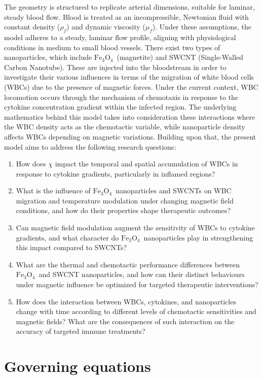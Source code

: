 \documentclass[10pt]{NSP1}
\def\feo{\ensuremath{\mathrm{Fe}_3\mathrm{O}_4}}
\begin{document}
	The geometry is structured to replicate arterial dimensions, suitable for laminar, steady blood flow. Blood is treated as an incompressible, Newtonian fluid with constant density ($\rho_{f}$) and dynamic viscosity ($\mu_{f}$). Under these assumptions, the model adheres to a steady, laminar flow profile, aligning with physiological conditions in medium to small blood vessels. There exist two types of nanoparticles, which include \feo\ (magnetite) and SWCNT (Single-Walled Carbon Nanotube). These are injected into the bloodstream in order to investigate their various influences in terms of the migration of white blood cells (WBCs) due to the presence of magnetic forces. Under the current context, WBC locomotion occurs through the mechanism of chemotaxis in response to the cytokine concentration gradient within the infected region. The underlying mathematics behind this model takes into consideration these interactions where the WBC density acts as the chemotactic variable, while nanoparticle density affects WBCs depending on magnetic variations. Building upon that, the present model aims to address the following research questions:
	\begin{enumerate}[label=\arabic*.]
		\item How does $\chi$ impact the temporal and spatial accumulation of WBCs in response to cytokine gradients, particularly in inflamed regions?
		\item What is the influence of \feo\ nanoparticles and SWCNTs on WBC migration and temperature modulation under changing magnetic field conditions, and how do their properties shape therapeutic outcomes?
		\item Can magnetic field modulation augment the sensitivity of WBCs to cytokine gradients, and what character do \feo\ nanoparticles play in strengthening this impact compared to SWCNTs?
		\item What are the thermal and chemotactic performance differences between \feo\ and SWCNT nanoparticles, and how can their distinct behaviours under magnetic influence be optimized for targeted therapeutic interventions?
		\item How does the interaction between WBCs, cytokines, and nanoparticles change with time according to different levels of chemotactic sensitivities and magnetic fields? What are the consequences of such interaction on the accuracy of targeted immune treatments?
	\end{enumerate}
	
	\section{Governing equations}
	
\end{document}
